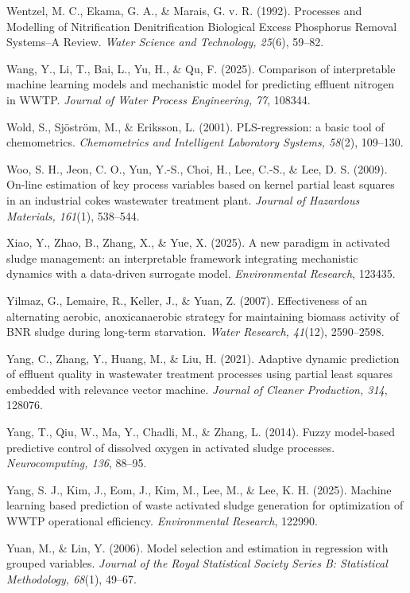 \documentclass[a4paper,fleqn]{cas-sc}
\begin{document}
\noindent Wentzel, M. C., Ekama, G. A., \& Marais, G. v. R. (1992). Processes and Modelling of Nitrification Denitrification Biological Excess Phosphorus Removal Systems--A Review. \textit{Water Science and Technology, 25}(6), 59--82.

\noindent Wang, Y., Li, T., Bai, L., Yu, H., \& Qu, F. (2025). Comparison of interpretable machine learning models and mechanistic model for predicting effluent nitrogen in WWTP. \textit{Journal of Water Process Engineering, 77}, 108344.

\noindent Wold, S., Sj\"ostr\"om, M., \& Eriksson, L. (2001). PLS-regression: a basic tool of chemometrics. \textit{Chemometrics and Intelligent Laboratory Systems, 58}(2), 109--130.

\noindent Woo, S. H., Jeon, C. O., Yun, Y.-S., Choi, H., Lee, C.-S., \& Lee, D. S. (2009). On-line estimation of key process variables based on kernel partial least squares in an industrial cokes wastewater treatment plant. \textit{Journal of Hazardous Materials, 161}(1), 538--544.

\noindent Xiao, Y., Zhao, B., Zhang, X., \& Yue, X. (2025). A new paradigm in activated sludge management: an interpretable framework integrating mechanistic dynamics with a data-driven surrogate model. \textit{Environmental Research}, 123435.

\noindent Yilmaz, G., Lemaire, R., Keller, J., \& Yuan, Z. (2007). Effectiveness of an alternating aerobic, anoxic\/anaerobic strategy for maintaining biomass activity of BNR sludge during long-term starvation. \textit{Water Research, 41}(12), 2590--2598.

\noindent Yang, C., Zhang, Y., Huang, M., \& Liu, H. (2021). Adaptive dynamic prediction of effluent quality in wastewater treatment processes using partial least squares embedded with relevance vector machine. \textit{Journal of Cleaner Production, 314}, 128076.

\noindent Yang, T., Qiu, W., Ma, Y., Chadli, M., \& Zhang, L. (2014). Fuzzy model-based predictive control of dissolved oxygen in activated sludge processes. \textit{Neurocomputing, 136}, 88--95.

\noindent Yang, S. J., Kim, J., Eom, J., Kim, M., Lee, M., \& Lee, K. H. (2025). Machine learning based prediction of waste activated sludge generation for optimization of WWTP operational efficiency. \textit{Environmental Research}, 122990.

\noindent Yuan, M., \& Lin, Y. (2006). Model selection and estimation in regression with grouped variables. \textit{Journal of the Royal Statistical Society Series B: Statistical Methodology, 68}(1), 49--67.
\end{document}
